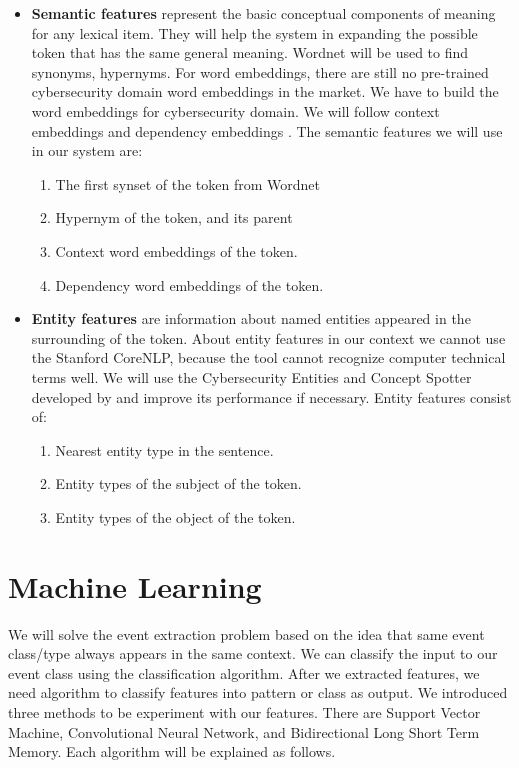 \begin{itemize}
\item \textbf{Semantic features} represent the basic conceptual components of meaning for any lexical item. They will help the system in expanding the possible token that has the same general meaning. Wordnet \cite{fellbaum1998wordnet} will be used to find synonyms, hypernyms. For word embeddings, there are still no pre-trained cybersecurity domain word embeddings in the market. We have to build the word embeddings for cybersecurity domain. We will follow context embeddings \cite{mikolov2013efficient} and dependency embeddings \cite{levy2014dependency}. The semantic features we will use in our system are:
\begin{enumerate}
    \item The first synset of the token from Wordnet
    \item Hypernym of the token, and its parent
    \item Context word embeddings of the token.
    \item Dependency word embeddings of the token. 
\end{enumerate}

\item \textbf{Entity features} are information about named entities appeared in the surrounding of the token. About entity features in our context we cannot use the Stanford CoreNLP, because the tool cannot recognize computer technical terms well. We will use the Cybersecurity Entities and Concept Spotter developed by \cite{lal2013} and improve its performance if necessary. Entity features consist of: 
\begin{enumerate}
    \item Nearest entity type in the sentence.
    \item Entity types of the subject of the token.
    \item Entity types of the object of the token.
    
\end{enumerate}

\end{itemize}

\section{Machine Learning}
\label{machinelearning}
We will solve the event extraction problem based on the idea that same event class/type always appears in the same context. We can classify the input to our event class using the classification algorithm. After we extracted features, we need algorithm to classify features into pattern or class as output. We introduced three methods to be experiment with our features. There are Support Vector Machine, Convolutional Neural Network, and Bidirectional Long Short Term Memory. Each algorithm will be explained as follows.

